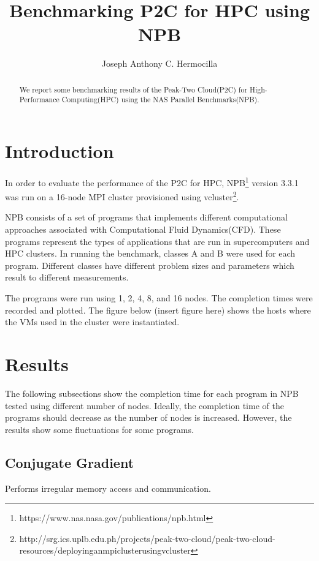 \documentclass[a4paper]{article}
\title{Benchmarking P2C for HPC using NPB}
\author{Joseph Anthony C. Hermocilla}
\begin{document}
\maketitle

\begin{abstract}
We report some benchmarking results of the Peak-Two Cloud(P2C) for High-Performance Computing(HPC) using the NAS Parallel Benchmarks(NPB).
\end{abstract}

\section{Introduction}

In order to evaluate the performance of the P2C\cite{hermocilla-p2c-ncite2014} for HPC, NPB\footnote{https://www.nas.nasa.gov/publications/npb.html} version 3.3.1 was run on a 16-node MPI cluster provisioned using vcluster\footnote{http://srg.ics.uplb.edu.ph/projects/peak-two-cloud/peak-two-cloud-resources/deployinganmpiclusterusingvcluster}.

NPB consists of a set of programs that implements different computational approaches associated with Computational Fluid Dynamics(CFD). These programs represent the types of applications that are run in supercomputers and HPC clusters. In running the benchmark, classes A and B were used for each program. Different classes have different problem sizes and parameters which result to different measurements.

The programs were run using 1, 2, 4, 8, and 16 nodes. The completion times were recorded and plotted. 
The figure below (insert figure here) shows the hosts where the VMs used in the cluster were instantiated. 


\section{Results}

The following subsections show the completion time for each program in NPB tested using different number of nodes. Ideally, the completion time of the programs should decrease as the number of nodes is increased. However, the results show some fluctuations for some programs. 

\subsection{Conjugate Gradient}

Performs irregular memory access and communication.
\end{document}
